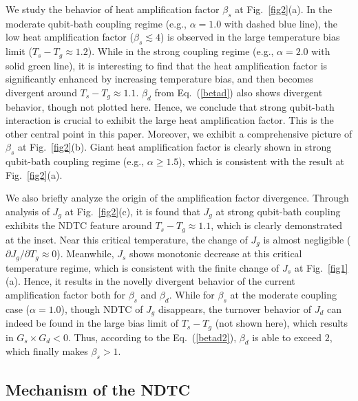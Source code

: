 \documentclass[twocolumn,preprintnumbers,amsmath,amssymb]{revtex4}
\begin{document}
We study the behavior of heat amplification factor $\beta_s$ at Fig.~\ref{fig2}(a).
In the moderate qubit-bath coupling regime (e.g., $\alpha=1.0$ with dashed blue line),
the low heat amplification factor ($\beta_s{\lesssim}4$) is observed in the large temperature bias limit ($T_s-T_g{\approx}1.2$).
While in the strong coupling regime (e.g., $\alpha=2.0$ with solid green line), it is interesting to find that the heat amplification factor is significantly enhanced by increasing temperature bias, and then becomes divergent around $T_s-T_g{\approx}1.1$.
$\beta_d$ from Eq.~(\ref{betad}) also shows divergent behavior, though not plotted here.
Hence, we conclude that strong qubit-bath interaction is crucial to exhibit the large heat amplification factor.
This is the other central point in this paper.
Moreover, we exhibit a comprehensive picture of $\beta_s$ at Fig.~\ref{fig2}(b).
Giant heat amplification factor is clearly shown in strong qubit-bath coupling regime (e.g., $\alpha{\ge}1.5$),
which is consistent with the result at Fig.~\ref{fig2}(a).

We also briefly analyze the origin of the amplification factor divergence.
Through analysis of $J_g$ at Fig.~\ref{fig2}(c), it is found that $J_g$ at strong qubit-bath coupling exhibits the NDTC feature around $T_s-T_g{\approx}1.1$,
which is clearly demonstrated at the inset.
Near this critical temperature, the change of $J_g$ is almost negligible (${\partial}J_g/{\partial}T_g{\approx}0$).
Meanwhile, $J_s$ shows monotonic decrease at this critical temperature regime, which is consistent with the finite change of $J_s$ at Fig.~\ref{fig1}(a).
Hence, it results in the novelly divergent behavior of the current amplification factor both for $\beta_s$ and $\beta_d$.
While for $\beta_s$ at the moderate coupling case ($\alpha=1.0$),
though NDTC of $J_g$ disappears, the turnover behavior of $J_d$ can indeed be found in the large bias limit of $T_s-T_g$ (not shown here), which
results in $G_s{\times}G_d<0$.
Thus, according to the Eq.~(\ref{betad2}), $\beta_d$ is able to exceed $2$, which finally makes $\beta_s>1$.


\subsection{Mechanism of the NDTC}
\end{document}
